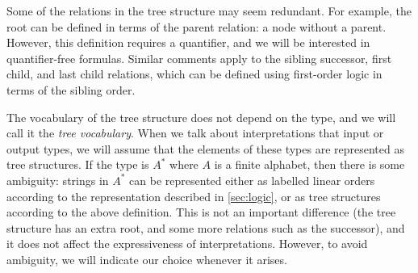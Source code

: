 Some of the relations in the tree structure may seem redundant. For example, the root can be defined in terms of the parent relation: a node without a parent. However, this definition requires a quantifier, and we will be interested in quantifier-free formulas. Similar comments apply to the sibling successor, first child, and last child relations, which can be defined using first-order logic in terms of the sibling order.

The vocabulary of the tree structure does not depend on the type, and we will call it the \emph{tree vocabulary}.  When we talk about interpretations that input or output types, we will assume that the elements of these types are represented as tree structures. If the type is $A^*$ where $A$ is a finite alphabet, then there is some ambiguity:  strings in $A^*$ can be represented either as labelled linear orders according to the representation described in \cref{sec:logic}, or as tree structures according to the above definition. This is not an important difference (the tree structure has an extra root, and some more relations such as the successor), and it does not affect the expressiveness of \mso interpretations. However, to avoid ambiguity,  we will indicate our choice whenever it arises. 

